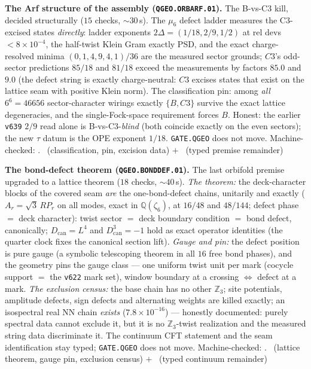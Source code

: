 \par\smallskip\noindent\textbf{The Arf structure of the assembly
(\texttt{QGEO.ORBARF.01}).}
The B-vs-C3 kill, decided structurally ($15$ checks, ${\sim}30$\,s).
The $\mu_6$ defect ladder measures the C3-excised states
\emph{directly}: ladder exponents $2\Delta=(1/18, 2/9, 1/2)$ at rel
devs $<8\times10^{-4}$, the half-twist Klein Gram exactly PSD, and
the exact charge-resolved minima $(0,1,4,9,4,1)/36$ are the measured
sector grounds; $C3$'s odd-sector predictions $85/18$ and $81/18$
exceed the measurements by factors $85.0$ and $9.0$ (the defect
string is exactly charge-neutral: $C3$ excises states that exist on
the lattice seam with positive Klein norm).  The classification pin:
among \emph{all} $6^6=46656$ sector-character wirings exactly
$\{B, C3\}$ survive the exact lattice degeneracies, and the
single-Fock-space requirement forces $B$.  Honest: the earlier
\texttt{v639} $2/9$ read alone is B-vs-C3-\emph{blind} (both coincide
exactly on the even sectors); the new $\tau$ datum is the OPE
exponent $1/18$.  \texttt{GATE.QGEO} does not move.
Machine-checked: .
\mE\ (classification, pin, excision data) $+$ \mC\ (typed premise
remainder)
\par\smallskip

\par\smallskip\noindent\textbf{The bond-defect theorem
(\texttt{QGEO.BONDDEF.01}).}
The last orbifold premise upgraded to a lattice theorem ($18$ checks,
${\sim}40$\,s).  \emph{The theorem:} the deck-character blocks of the
covered seam \emph{are} the one-bond-defect chains, unitarily and
exactly ($A_r=\sqrt3\,R P_r$ on all modes, exact in
$\mathbb{Q}(\zeta_6)$, at $16/48$ and $48/144$; defect phase $=$ deck
character): twist sector $=$ deck boundary condition $=$ bond defect,
canonically; $D_{\mathrm{can}}=L^4$ and $D_{\mathrm{can}}^3=-1$ hold
as exact operator identities (the quarter clock fixes the canonical
section lift).  \emph{Gauge and pin:} the defect position is pure
gauge (a symbolic telescoping theorem in all $16$ free bond phases),
and the geometry pins the gauge class --- one uniform twist unit per
mark (cocycle support $=$ the \texttt{v622} mark set), window
boundary at a crossing $\Leftrightarrow$ defect at a mark.  \emph{The
exclusion census:} the base chain has no other $\mathbb{Z}_3$; site
potentials, amplitude defects, sign defects and alternating weights
are killed exactly; an isospectral real NN chain \emph{exists}
($7.8\times10^{-16}$) --- honestly documented: purely spectral data
cannot exclude it, but it is no $\mathbb{Z}_3$-twist realization and
the measured string data discriminate it.  The continuum CFT
statement and the seam identification stay typed; \texttt{GATE.QGEO}
does not move.
Machine-checked: .
\mE\ (lattice theorem, gauge pin, exclusion census) $+$ \mC\ (typed
continuum remainder)
\par\smallskip


